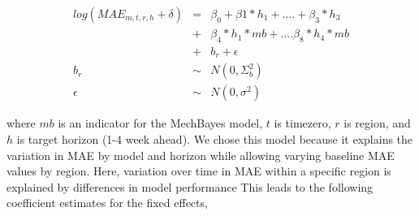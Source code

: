 \documentclass[11pt]{amsart}
\begin{document}
\begin{eqnarray}
log(MAE_{m,t,r,h} +\delta) &=& \beta_0 +  \beta1*h_1 + ....+ \beta_3*h_3 \\
&+& \beta_4 *h_1*mb + .... \beta_8*h_4*mb\\
 &+& b_{r} + \epsilon \\
b_{r} &\sim &N(0,\Sigma_b^2)\\
\epsilon &\sim& N(0,\sigma^2)
\end{eqnarray}

where $mb$ is an indicator for the MechBayes model, $t$ is timezero, $r$ is region, and $h$ is target horizon (1-4 week ahead). We chose this model because it explains the variation in MAE by model and horizon while allowing varying baseline MAE values by region. Here, variation over time in MAE within a specific region is explained by differences in model performance This leads to the following coefficient estimates for the fixed effects,
\end{document}
